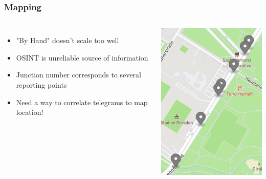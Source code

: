 \begin{frame}
  \frametitle{Mapping}
  \begin{columns}
    \begin{itemize}
      \item "By Hand" doesn't scale too well
      \item OSINT is unreliable source of information
      \item Junction number corresponds to several reporting points
      \item Need a way to correlate telegrams to map location!
    \end{itemize}
    \includegraphics[width=\columnwidth]{./figs/moar_points.png}
  \end{columns}
\end{frame}


